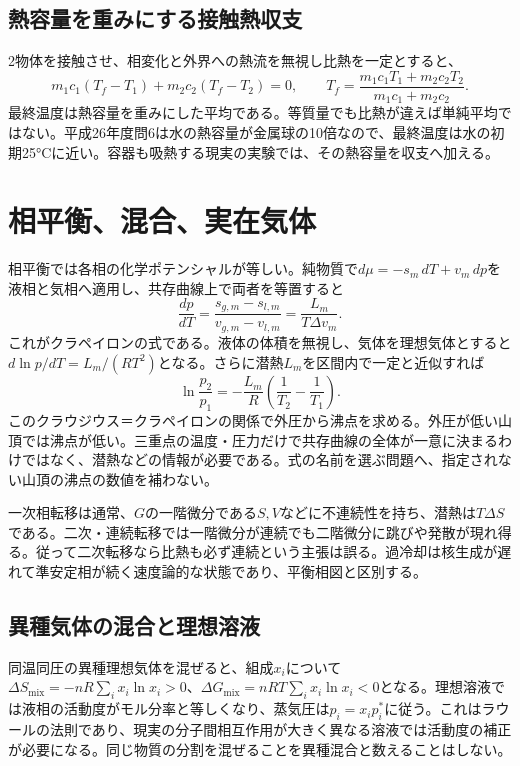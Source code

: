 \subsection{熱容量を重みにする接触熱収支}
\label{theory:thermo:mixheat}
2物体を接触させ、相変化と外界への熱流を無視し比熱を一定とすると、
\[
 m_1c_1(T_f-T_1)+m_2c_2(T_f-T_2)=0,
 \qquad T_f=\frac{m_1c_1T_1+m_2c_2T_2}{m_1c_1+m_2c_2}.
\]
最終温度は熱容量を重みにした平均である。等質量でも比熱が違えば単純平均ではない。平成26年度問6は水の熱容量が金属球の10倍なので、最終温度は水の初期25°Cに近い。容器も吸熱する現実の実験では、その熱容量を収支へ加える。

\section{相平衡、混合、実在気体}
\label{theory:thermo:phase}
相平衡では各相の化学ポテンシャルが等しい。純物質で$d\mu=-s_m\,dT+v_m\,dp$を液相と気相へ適用し、共存曲線上で両者を等置すると
\[
 \frac{dp}{dT}=\frac{s_{g,m}-s_{l,m}}{v_{g,m}-v_{l,m}}
 =\frac{L_m}{T\Delta v_m}.
\]
これがクラペイロンの式である。液体の体積を無視し、気体を理想気体とすると$d\ln p/dT=L_m/(RT^2)$となる。さらに潜熱$L_m$を区間内で一定と近似すれば
\[
 \ln\frac{p_2}{p_1}=-\frac{L_m}{R}\left(\frac1{T_2}-\frac1{T_1}\right).
\]
このクラウジウス＝クラペイロンの関係で外圧から沸点を求める\parencite{mit_clapeyron2008}。外圧が低い山頂では沸点が低い。三重点の温度・圧力だけで共存曲線の全体が一意に決まるわけではなく、潜熱などの情報が必要である。式の名前を選ぶ問題へ、指定されない山頂の沸点の数値を補わない。

一次相転移は通常、$G$の一階微分である$S,V$などに不連続性を持ち、潜熱は$T\Delta S$である。二次・連続転移では一階微分が連続でも二階微分に跳びや発散が現れ得る。従って二次転移なら比熱も必ず連続という主張は誤る。過冷却は核生成が遅れて準安定相が続く速度論的な状態であり、平衡相図と区別する。

\subsection{異種気体の混合と理想溶液}
\label{theory:thermo:mixing}
同温同圧の異種理想気体を混ぜると、組成$x_i$について$\Delta S_{\mathrm{mix}}=-nR\sum_i x_i\ln x_i>0$、$\Delta G_{\mathrm{mix}}=nRT\sum_i x_i\ln x_i<0$となる。理想溶液では液相の活動度がモル分率と等しくなり、蒸気圧は$p_i=x_i p_i^*$に従う。これはラウールの法則であり、現実の分子間相互作用が大きく異なる溶液では活動度の補正が必要になる\parencite{mit_solutions2008}。同じ物質の分割を混ぜることを異種混合と数えることはしない。


